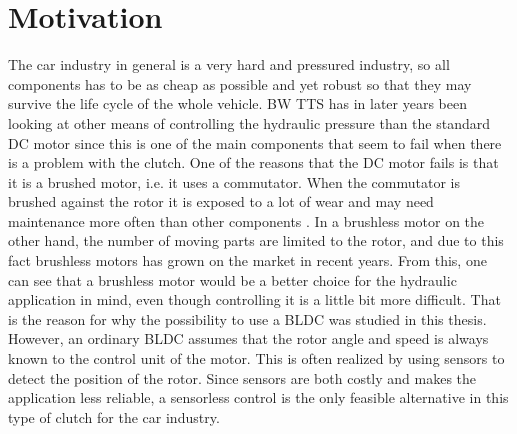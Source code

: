 \documentclass{LTHthesis}
\begin{document}
\section{Motivation}
The car industry in general is a very hard and pressured industry, so all components has to be as cheap as possible and yet robust so that they may survive the life cycle of the whole vehicle. BW TTS has in later years been looking at other means of controlling the hydraulic pressure than the standard DC motor since this is one of the main components that seem to fail when there is a problem with the clutch. One of the reasons that the DC motor fails is that it is a brushed motor, i.e. it uses a commutator. When the commutator is brushed against the rotor it is exposed to a lot of wear and may need maintenance more often than other components \cite{ala_kar2014}. In a brushless motor on the other hand, the number of moving parts are limited to the rotor, and due to this fact brushless motors has grown on the market in recent years.
From this, one can see that a brushless motor would be a better choice for the hydraulic application in mind, even though controlling it is a little bit more difficult. That is the reason for why the possibility to use a BLDC was studied in this thesis. 
However, an ordinary BLDC assumes that the rotor angle and speed is always known to the control unit of the motor. This is often realized by using sensors to detect the position of the rotor. Since sensors are both costly and makes the application less reliable, a sensorless control is the only feasible alternative in this type of clutch for the car industry.
\end{document}
